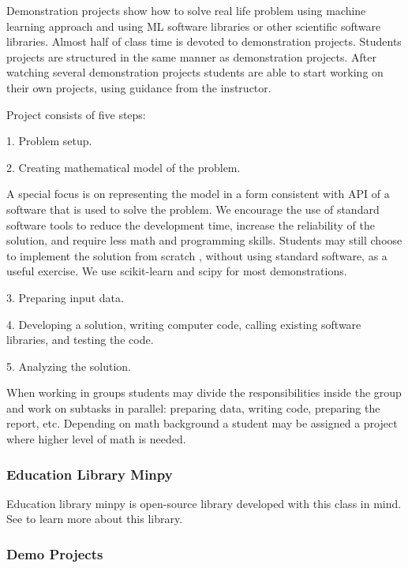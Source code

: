 Demonstration projects show how to solve real life problem using machine learning approach and using ML software libraries or other scientific software libraries. Almost half of class time is devoted to demonstration projects. Students projects are structured in the same manner as demonstration projects. After watching several demonstration projects students are able to start working on their own projects, using guidance from the instructor. 

Project consists of five steps: 

1. Problem setup. 

2. Creating mathematical model of the problem.

A special focus is on representing the model in a form consistent with API of a software that is used to solve the problem.  We encourage the use of standard software tools to reduce the development time, increase the reliability of the solution, and require less math and programming skills.
Students  may still choose to implement the solution from scratch , without using standard software, as a useful exercise. We use scikit-learn and scipy for most demonstrations.

3. Preparing input data.  

4. Developing a solution, writing computer code, calling existing software libraries, and testing  the code.


5. Analyzing the solution. 

When working in groups students may divide the responsibilities inside the group and work on subtasks in parallel: preparing data, writing code, preparing the report, etc. Depending on math background a student may be assigned a project where higher level of math is needed.

\subsubsection{Education Library Minpy \label{education library minpy}}

Education library minpy is open-source library developed with this class in mind. See \cite{MP}  to learn more about this library.

\subsubsection{Demo Projects \label{demo projects}}


